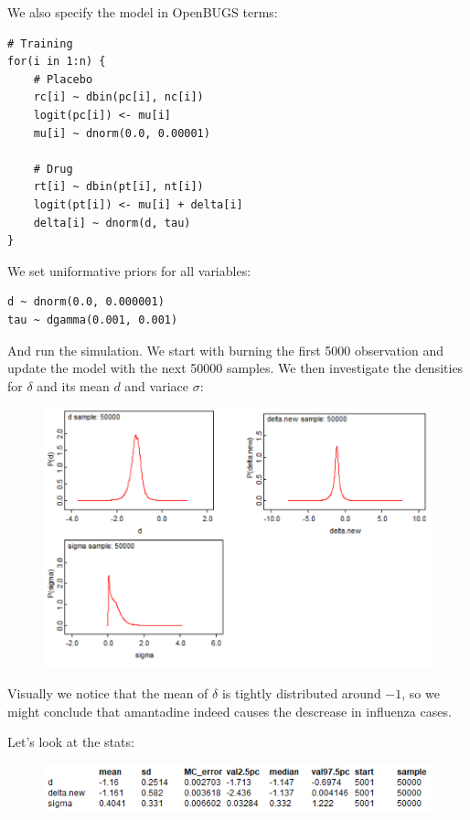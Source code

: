 \documentclass[a4 paper]{article}
\begin{document}
We also specify the model in OpenBUGS terms:

\begin{Verbatim}
# Training
for(i in 1:n) {
	# Placebo
	rc[i] ~ dbin(pc[i], nc[i])
	logit(pc[i]) <- mu[i]
	mu[i] ~ dnorm(0.0, 0.00001)
	
	# Drug
	rt[i] ~ dbin(pt[i], nt[i])
	logit(pt[i]) <- mu[i] + delta[i]
	delta[i] ~ dnorm(d, tau)
}
\end{Verbatim}

We set uniformative priors for 
all variables:

\begin{Verbatim}
d ~ dnorm(0.0, 0.000001)
tau ~ dgamma(0.001, 0.001)
\end{Verbatim}

And run the simulation.
We start 
with burning 
the first 5000 observation and update the model 
with the next 50000 samples.
We then investigate the 
densities for $\delta$ and its 
mean $d$ and variace $\sigma$:

\begin{figure}[H]
	\includegraphics[scale=1.0]{q3}
	\centering
	\label{q3}
\end{figure}

Visually we notice that the mean 
of $\delta$ is tightly distributed 
around $-1$, so we might conclude
that amantadine indeed causes the
descrease in influenza cases.

Let's look at the stats:

\begin{figure}[H]
 	\includegraphics[scale=1.0]{q3_1}
 	\centering
 	\label{q3_1}
\end{figure}
\end{document}
